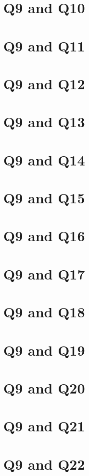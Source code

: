 \documentclass{report}
\begin{document}
\section{Q9 and Q10}\clearpage
\section{Q9 and Q11}\clearpage
\section{Q9 and Q12}\clearpage
\section{Q9 and Q13}\clearpage
\section{Q9 and Q14}\clearpage
\section{Q9 and Q15}\clearpage
\section{Q9 and Q16}\clearpage
\section{Q9 and Q17}\clearpage
\section{Q9 and Q18}\clearpage
\section{Q9 and Q19}\clearpage
\section{Q9 and Q20}\clearpage
\section{Q9 and Q21}\clearpage
\section{Q9 and Q22}\clearpage
\end{document}
